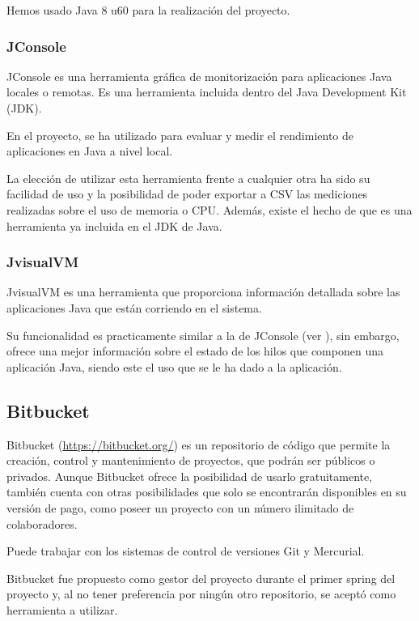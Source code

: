 Hemos usado Java 8 u60 para la realización del proyecto.

\subsubsection{JConsole}\label{DefJConsole}

JConsole es una herramienta gráfica de monitorización para aplicaciones Java locales o remotas. Es una herramienta incluida dentro del Java Development Kit (JDK).

En el proyecto, se ha utilizado para evaluar y medir el rendimiento de aplicaciones en Java a nivel local.

La elección de utilizar esta herramienta frente a cualquier otra ha sido su facilidad de uso y la posibilidad de poder exportar a CSV las mediciones realizadas sobre el uso de memoria o CPU. Además, existe el hecho de que es una herramienta ya incluida en el JDK de Java.

\subsubsection{JvisualVM}\label{DefJvisualVM}
JvisualVM es una herramienta que proporciona información detallada sobre las aplicaciones Java que están corriendo en el sistema.

Su funcionalidad es practicamente similar a la de JConsole (ver ), sin embargo, ofrece una mejor información sobre el estado de los hilos que componen una aplicación Java, siendo este el uso que se le ha dado a la aplicación.

\subsection{Bitbucket}\label{DefBitbucket}
Bitbucket (\url{https://bitbucket.org/}) es un repositorio de código que permite la creación, control y mantenimiento de proyectos, que podrán ser públicos o privados. Aunque Bitbucket ofrece la posibilidad de usarlo gratuitamente, también cuenta con otras posibilidades que solo se encontrarán disponibles en su versión de pago, como poseer un proyecto con un número ilimitado de colaboradores.

Puede trabajar con los sistemas de control de versiones Git y Mercurial.

Bitbucket fue propuesto como gestor del proyecto durante el primer spring del proyecto y, al no tener preferencia por ningún otro repositorio, se aceptó como herramienta a utilizar.

